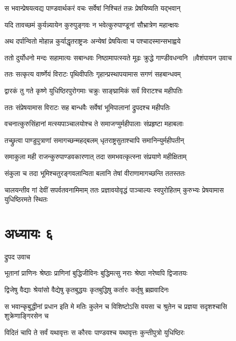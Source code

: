 \twolineshloka
{स भवान्प्रेषयत्वद्य पाण्डवार्थकरं वचः}
{सर्वेषां निश्चितं तन्नः प्रेषयिष्यति यद्भवान्}


\twolineshloka
{यदि तावच्छमं कुर्यन्न्यायेन कुरुपुङ्गवः}
{न भवेत्कुरुपाण्डूनां सौभ्रात्रेण महान्क्षयः}


\twolineshloka
{अथ दर्पान्वितो मोहान्न कुर्याद्धृतराष्ट्रजः}
{अन्येषां प्रेषयित्वा च पश्चादस्मान्सभाह्वये}


\threelineshloka
{ततो दुर्योधनो मन्दः सहामात्यः सबान्धवः}
{निष्ठामापत्स्यते मूढः क्रुद्धे गाण्डीवधन्वनि ॥वैशंपायन उवाच}
{}


\twolineshloka
{ततः सत्कृत्य वार्ष्णेयं विराटः पृथिवीपतिः}
{गृहान्प्रस्थापयामास सगणं सहबान्धवम्}


\twolineshloka
{द्वारकं तु गते कृष्णे युधिष्ठिरपुरोगमाः}
{चक्रुः साङ्घ्रामिकं सर्वं विराटश्च महीपतिः}


\twolineshloka
{ततः संप्रेषयामास विराटः सह बान्धवैः}
{सर्वेषां भूमिपालानां द्रुपदश्च महीपतिः}


\twolineshloka
{वचनात्कुरुसिंहानां मत्स्यपाञ्चालयोश्च ते}
{समाजग्मुर्महीपालाः संप्रहृष्टा महाबलाः}


\twolineshloka
{तच्छ्रुत्वा पाण्डुपुत्राणां समागच्छन्महद्बलम्}
{धृतराष्ट्रसुताश्चापि समानिन्युर्महीपतीन्}


\twolineshloka
{समाकुला मही राजन्कुरुपाण्डवकारणात्}
{तदा समभवत्कृत्स्ना संप्रयाणे महीक्षिताम्}


\twolineshloka
{संकुला च तदा भूमिश्चतुरङ्गवलान्विता}
{बलानि तेषां वीराणामागच्छन्ति ततस्ततः}


\threelineshloka
{चालयन्तीव गां देवीं सपर्वतवनामिमाम्}
{ततः प्रज्ञावयोवृद्धं पाञ्चाल्यः स्वपुरोहितम्}
{कुरुभ्यः प्रेषयामास युधिष्ठिरमते स्थितः}


\chapter{अध्यायः ६}
\twolineshloka
{द्रुपद उवाच}
{}


\twolineshloka
{भूतानां प्राणिनः श्रेष्ठाः प्राणिनां बुद्धिजीविनः}
{बुद्धिमत्सु नराः श्रेष्ठा नरेष्वपि द्विजातयः}


\twolineshloka
{द्विजेषु वैद्याः श्रेयांसो वैद्येषु कृतबुद्धयः}
{कृतबुद्धिषु कर्तारः कर्तृषु ब्रह्मवादिनः}


\threelineshloka
{स भवान्कृबुद्धीनां प्रधान इति मे मतिः}
{कुलेन च विशिष्टोऽसि वयसा च श्रुतेन च}
{प्रज्ञया सदृशश्चासि शुक्रेणाङ्गिरसेन च}


\twolineshloka
{विदितं चापि ते सर्वं यथावृत्तः स कौरवः}
{पाण्डवश्च यथावृत्तः कुन्तीपुत्रो युधिष्ठिरः}



